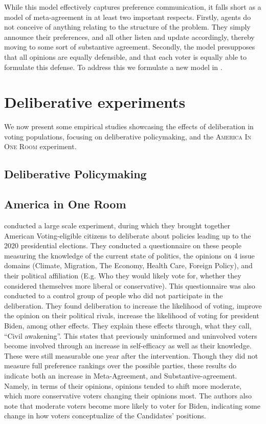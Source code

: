 While this model effectively captures preference communication, it falls short
as a model of meta-agreement in at least two important respects. Firstly,
agents do not conceive of anything relating to the structure of the problem.
They simply announce their preferences, and all other listen and update
accordingly, thereby moving to some sort of substantive agreement. Secondly,
the model presupposes that all opinions are equally defensible, and that each
voter is equally able to formulate this defense. To address this we formulate a
new model in .


\section{Deliberative experiments}

We now present some empirical studies showcasing the effects of deliberation in
voting populations, focusing on deliberative policymaking, and the
\textsc{America In One Room} experiment.

\subsection{Deliberative Policymaking}

\subsection{America in One Room}\label{sub:americainonroom} \citet{fishkinCanDeliberationHave2024}
conducted a large scale experiment, during which they brought together American
Voting-eligible citizens to deliberate about policies leading up to the 2020
presidential elections. They conducted a questionnaire on these people
measuring the knowledge of the current state of politics, the opinions on 4
issue domains (Climate, Migration, The Economy, Health Care, Foreign Policy), and
their political affiliation (E.g. Who they would likely vote for, whether they
considered themselves more liberal or conservative). This questionnaire was
also conducted to a control group of people who did not participate in the
deliberation. They found deliberation to increase the likelihood of voting,
improve the opinion on their political rivals, increase the likelihood of
voting for president Biden, among other effects. They explain these effects
through, what they call, ``Civil awakening''. This states that previously
uninformed and uninvolved voters become involved through an increase in
self-efficacy as well as their knowledge. These were still measurable one year
after the intervention. Though they did not measure full preference rankings
over the possible parties, these results do indicate both an increase in
Meta-Agreement, and Substantive-agreement. Namely, in terms of their opinions,
opinions tended to shift more moderate, which more conservative voters changing
their opinions most. The authors also note that moderate voters become more
likely to voter for Biden, indicating some change in how voters conceptualize
of the Candidates' positions.


